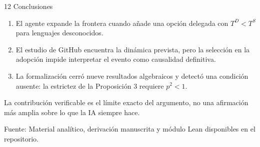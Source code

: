 \documentclass[aspectratio=169,11pt]{beamer}
\newcommand{\sourcefoot}[1]{\vfill{\scriptsize\color{black!60}Fuente: #1}}
\begin{document}
\begin{frame}{12 \textperiodcentered{} Conclusiones}
  \begin{enumerate}
    \item El agente expande la frontera cuando añade una opción delegada con
      $T^D<T^S$ para lenguajes desconocidos.
    \item El estudio de GitHub encuentra la dinámica prevista, pero la selección
      en la adopción impide interpretar el evento como causalidad definitiva.
    \item La formalización cerró nueve resultados algebraicos y detectó una
      condición ausente: la estrictez de la Proposición 3 requiere $p^2<1$.
  \end{enumerate}

  \medskip
  \begin{center}
    \alert{La contribución verificable es el límite exacto del argumento, no una afirmación más amplia sobre lo que la IA siempre hace.}
  \end{center}

  \sourcefoot{Material analítico, derivación manuscrita y módulo Lean disponibles en el repositorio.}
\end{frame}
\end{document}
